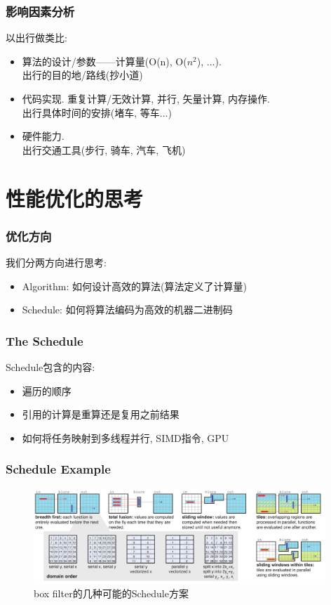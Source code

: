 \documentclass[hyperref]{beamer}
\begin{document}
\begin{frame}
  \frametitle{影响因素分析}
  以出行做类比:
  \begin{itemize}
  \item 算法的设计/参数——计算量(O(n), O($n^2$), ...). \\出行的目的地/路线(抄小道)
  \item 代码实现. 重复计算/无效计算, 并行, 矢量计算, 内存操作. \\出行具体时间的安排(堵车, 等车...)
  \item 硬件能力. \\出行交通工具(步行, 骑车, 汽车, 飞机)
  \end{itemize}
\end{frame}

\section{性能优化的思考}
\begin{frame}
  \frametitle{优化方向}
  我们分两方向进行思考:
  \begin{itemize}
    \item Algorithm: 如何设计高效的算法(算法定义了计算量)
    \item Schedule: 如何将算法编码为高效的机器二进制码
  \end{itemize}
\end{frame}

\begin{frame}
  \frametitle{The Schedule}
  Schedule包含的内容:
  \begin{itemize}
  \item 遍历的顺序
  \item 引用的计算是重算还是复用之前结果
  \item 如何将任务映射到多线程并行, SIMD指令, GPU
  \end{itemize}
\end{frame}

\begin{frame}
  \frametitle{Schedule Example}
  \begin{figure}[H]
    \centering
    \includegraphics[width=11cm]{simple_pipline.png}
    \caption{box filter的几种可能的Schedule方案}
    \label{fig:schedule-example}
  \end{figure}
  
\end{frame}
\end{document}
